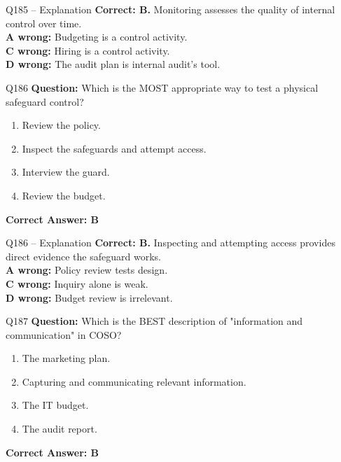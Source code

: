 \documentclass[aspectratio=169,10pt]{beamer}
\begin{document}
	\begin{frame}[t]{Q185 -- Explanation}
		\small
		\textbf{Correct: B.} Monitoring assesses the quality of internal control over time. \\[4pt]
		\textbf{A wrong:} Budgeting is a control activity. \\[2pt]
		\textbf{C wrong:} Hiring is a control activity. \\[2pt]
		\textbf{D wrong:} The audit plan is internal audit's tool.
	\end{frame}
	
	\begin{frame}[t]{Q186}
		\small
		\textbf{Question:} Which is the MOST appropriate way to test a physical safeguard control?
		\begin{enumerate}[label=\Alph*.,itemsep=1pt,topsep=2pt]
			\item Review the policy.
			\item Inspect the safeguards and attempt access.
			\item Interview the guard.
			\item Review the budget.
		\end{enumerate}
		\vspace{4pt}
		\textbf{Correct Answer: B}
	\end{frame}
	
	\begin{frame}[t]{Q186 -- Explanation}
		\small
		\textbf{Correct: B.} Inspecting and attempting access provides direct evidence the safeguard works. \\[4pt]
		\textbf{A wrong:} Policy review tests design. \\[2pt]
		\textbf{C wrong:} Inquiry alone is weak. \\[2pt]
		\textbf{D wrong:} Budget review is irrelevant.
	\end{frame}
	
	\begin{frame}[t]{Q187}
		\small
		\textbf{Question:} Which is the BEST description of "information and communication" in COSO?
		\begin{enumerate}[label=\Alph*.,itemsep=1pt,topsep=2pt]
			\item The marketing plan.
			\item Capturing and communicating relevant information.
			\item The IT budget.
			\item The audit report.
		\end{enumerate}
		\vspace{4pt}
		\textbf{Correct Answer: B}
	\end{frame}
	
\end{document}
